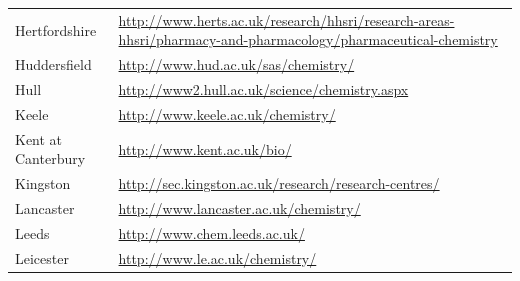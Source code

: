 \begin{table}[H]
\begin{tabular}{||p{2.5cm}|Y||}
 \footnotesize{Hertfordshire}                      & \footnotesize{\url{http://www.herts.ac.uk/research/hhsri/research-areas-hhsri/pharmacy-and-pharmacology/pharmaceutical-chemistry}}                        \\
 \footnotesize{Huddersfield}                       & \footnotesize{\url{http://www.hud.ac.uk/sas/chemistry/}}                                                                                                  \\
 \footnotesize{Hull       }                        & \footnotesize{\url{http://www2.hull.ac.uk/science/chemistry.aspx}}                                                                                        \\
 \footnotesize{Keele     }                         & \footnotesize{\url{http://www.keele.ac.uk/chemistry/}}                                                                                                    \\
 \footnotesize{Kent at Canterbury}                 & \footnotesize{\url{http://www.kent.ac.uk/bio/}}                                                                                                           \\
 \footnotesize{Kingston     }                      & \footnotesize{\url{http://sec.kingston.ac.uk/research/research-centres/}}                    
 \\
 \footnotesize{Lancaster   }                       & \footnotesize{\url{http://www.lancaster.ac.uk/chemistry/}}                                                                                                \\
\footnotesize{Leeds      }                        & \footnotesize{\url{http://www.chem.leeds.ac.uk/}}                                                                                                         \\
 \footnotesize{Leicester }                         & \footnotesize{\url{http://www.le.ac.uk/chemistry/}}                                                                                                                                                               
\\
\hline 
 \end{tabular}
 \end{table}
 
